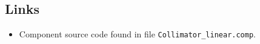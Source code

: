 \subsection*{Links}
\begin{itemize}
  \item Component source code found in file \texttt{Collimator\_linear.comp}.
\end{itemize}
